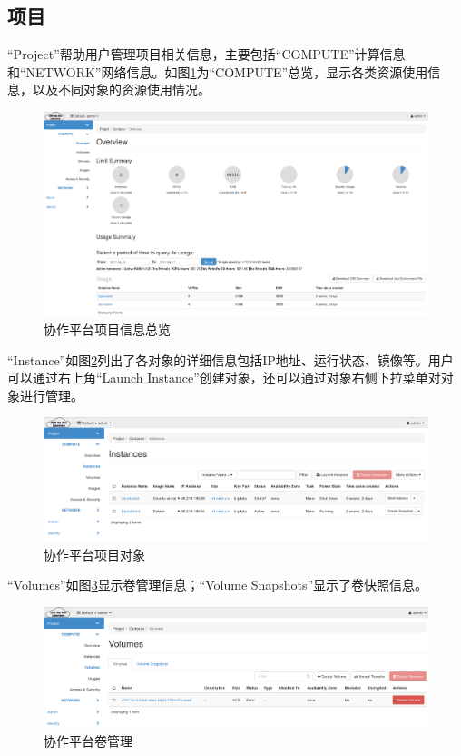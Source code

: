 \documentclass[12pt]{article}
\begin{document}
\subsection{项目}
``Project''帮助用户管理项目相关信息，主要包括``COMPUTE''计算信息和``NETWORK''网络信息。如图\ref{fig:projectcomputeoverview}为``COMPUTE''总览，显示各类资源使用信息，以及不同对象的资源使用情况。
\begin{figure}[!htb]
\centering
\includegraphics[width=6in]{./figures/Project_Compute_Overview}
\caption{协作平台项目信息总览}
\label{fig:projectcomputeoverview}
\end{figure}
``Instance''如图\ref{fig:projectcomputeinstances}列出了各对象的详细信息包括IP地址、运行状态、镜像等。用户可以通过右上角``Launch Instance''创建对象，还可以通过对象右侧下拉菜单对对象进行管理。
\begin{figure}[!htb]
\centering
\includegraphics[width=6in]{./figures/Project_Compute_Instances}
\caption{协作平台项目对象}
\label{fig:projectcomputeinstances}
\end{figure}
``Volumes''如图\ref{fig:projectcomputevolumes}显示卷管理信息；``Volume Snapshots''显示了卷快照信息。
\begin{figure}[!htb]
\centering
\includegraphics[width=6in]{./figures/Project_Compute_Volumes}
\caption{协作平台卷管理}
\label{fig:projectcomputevolumes}
\end{figure}
\end{document}
